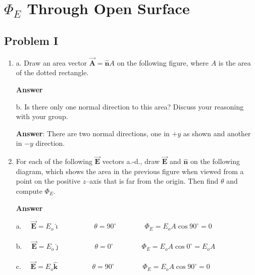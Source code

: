 \documentclass{article}
\newcommand{\ds}[0]{\displaystyle}
\newcommand{\ihat}[0]{\hat{\boldsymbol{\imath}}}
\newcommand{\jhat}[0]{\hat{\boldsymbol{\jmath}}}
\newcommand{\khat}[0]{\hat{\boldsymbol{k}}}
\newcommand{\bfvec}[1]{\vec{\mathbf{#1}}}
\begin{document}
\newpage

\section{$\Phi_E$ Through Open Surface}

\subsection{Problem I}

\begin{enumerate}

  \item a. Draw an area vector $\bfvec{A}=\hat{\mathbf{n}}A$ on the following figure, where $A$ is the area of the dotted rectangle.

        \ifsolutions
        \textbf{Answer}

        
        \else

        
        \fi

        b. Is there only one normal direction to this area? Discuss your reasoning with your group.

        \ifsolutions
        \textbf{Answer}: There are two normal directions, one in $+y$ as shown and another in $-y$ direction.
        \else
        \vskip 72pt
        \fi

  \item For each of the following $\bfvec{E}$ vectors a.-d., draw $\bfvec{E}$ and $\hat{\mathbf{n}}$ on the following diagram, which shows the area in the previous figure when viewed from a point on the positive $z$--axis that is far from the origin. Then find $\theta$ and compute $\Phi_E$.

        \ifsolutions
        \textbf{Answer}

        

        a. $\quad\ds\bfvec{E}=E_o\ihat\qquad\phantom{+\frac{E_o}{\sqrt{2}}\jhat}\theta=90^\circ\qquad\qquad\Phi_E=E_oA\cos 90^\circ = 0$

        b. $\quad\ds\bfvec{E}=E_o\jhat\qquad\phantom{+ \frac{E_o}{\sqrt{2}}\jhat}\theta=0^\circ\qquad\qquad\Phi_E=E_oA\cos 0^\circ=E_oA$ 

        c. $\quad\ds\bfvec{E}=E_o\khat\qquad\phantom{+\frac{E_o}{\sqrt{2}}\jhat}\theta=90^\circ\qquad\qquad\Phi_E=E_oA\cos 90^\circ=0$ 


\end{enumerate}
\end{document}
